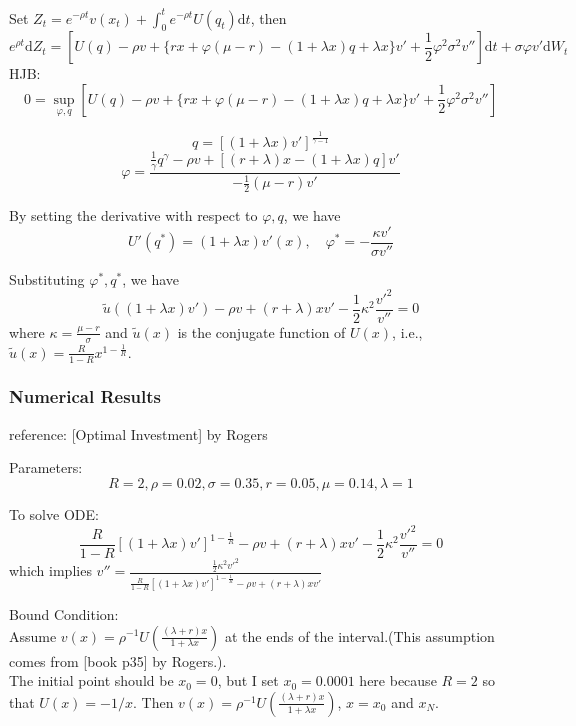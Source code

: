 \documentclass[a4paper]{article}
\theoremstyle{definition}
\numberwithin{equation}{section}
\begin{document}
Set $Z_t=e^{-\rho t}v(x_t)+\int^t_0e^{-\rho t}U(q_t)\mathrm dt$,
then
$$e^{\rho t}\mathrm dZ_t=[U(q)-\rho v+\{rx+\varphi(\mu-r)-(1+\lambda x)q+\lambda x\}v'+\frac{1}{2}\varphi^2\sigma^2v'']\mathrm dt+\sigma\varphi v'\mathrm dW_t$$
HJB:
$$0=\sup_{\varphi,q}[U(q)-\rho v+\{rx+\varphi(\mu-r)-(1+\lambda x)q+\lambda x\}v'+\frac{1}{2}\varphi^2\sigma^2v'']$$


$$q=[(1+\lambda x)v']^\frac{1}{\gamma-1}$$
$$\varphi=\frac{\frac{1}{\gamma}q^\gamma-\rho v+[(r+\lambda)x-(1+\lambda x)q]v'}{-\frac{1}{2}(\mu-r)v'}$$

By setting the derivative with respect to $\varphi,q$, we have
$$U'(q^*)=(1+\lambda x)v'(x),\quad\varphi^*=-\frac{\kappa v'}{\sigma v''}$$

Substituting $\varphi^*,q^*$, we have
$$\tilde u((1+\lambda x)v')-\rho v+(r+\lambda)xv'-\frac{1}{2}\kappa^2\frac{v'^2}{v''}=0$$
where $\kappa=\frac{\mu-r}{\sigma}$ and $\tilde u(x)$ is the conjugate function of $U(x)$, i.e., $\tilde u(x)=\frac{R}{1-R}x^{1-\frac{1}{R}}$.

\subsubsection{Numerical Results}
reference: [Optimal Investment] by Rogers

Parameters:
$$R=2,\rho=0.02,\sigma=0.35,r=0.05,\mu=0.14, \lambda=1$$

To solve ODE:
$$\frac{R}{1-R}[(1+\lambda x)v']^{1-\frac{1}{R}}-\rho v+(r+\lambda)xv'-\frac{1}{2}\kappa^2\frac{v'^2}{v''}=0$$
which implies $v''=\frac{\frac{1}{2}\kappa^2v'^2}{\frac{R}{1-R}[(1+\lambda x)v']^{1-\frac{1}{R}}-\rho v+(r+\lambda)xv'}$

Bound Condition:\\
Assume $v(x)=\rho^{-1}U\left(\frac{(\lambda+r)x}{1+\lambda x}\right)$ at the ends of the interval.(This assumption comes from [book p35] by Rogers.).\\
The initial point should be $x_0=0$, but I set $x_0=0.0001$ here because $R=2$ so that $U(x)=-1/x$. Then $v(x)=\rho^{-1}U\left(\frac{(\lambda+r)x}{1+\lambda x}\right)$, $x=x_0$ and $x_N$. %
\end{document}
